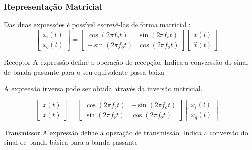 \documentclass[10pt,hyperref={pdfpagemode=FullScreen},aspectratio=169]{beamer}
\begin{document}
\begin{frame}
  \frametitle{Representação Matricial}

  Das duas expressões é possível escrevê-las de forma matricial :
$$
\begin{bmatrix} x_i(t)  \\ x_q(t) \end{bmatrix} = \begin{bmatrix} \cos(2\pi f_o t) & \sin(2 \pi f_o t)  \\ -\sin(2 \pi f_o t)  & \cos(2\pi f_o t)\end{bmatrix} \begin{bmatrix} x(t)  \\ \hat {x}(t) \end{bmatrix}
$$

\begin{block}{Receptor}
  A expressão define a operação de recepção. Indica a converssão do sinal de banda-passante para o seu equivalente passa-baixa
\end{block}


A expreesão inversa pode ser obtida através da inversão matricial. 

$$
\begin{bmatrix} x(t)  \\ \hat {x}(t) \end{bmatrix} = \begin{bmatrix} \cos(2\pi f_o t) & -\sin(2 \pi f_o t)  \\ \sin(2 \pi f_o t)  & \cos(2\pi f_o t)\end{bmatrix} \begin{bmatrix}  x_i(t)  \\ x_q(t) \end{bmatrix}
$$

\begin{block}{Transmissor}
  A expressão define a operação de transmissão. Indica a conversão do sinal de banda-básica para a banda passante
\end{block}

\end{frame}
\end{document}
